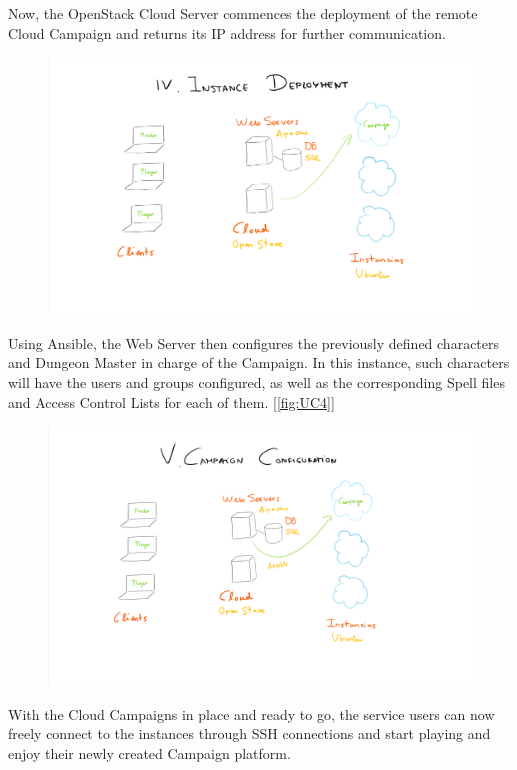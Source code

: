 \documentclass[a4paper,12pt]{report}
\begin{document}
Now, the OpenStack Cloud Server commences the deployment of the remote Cloud Campaign and returns its IP address for further communication. 
\begin{figure}[h!]
\caption{}
\centering
\includegraphics[width=1\textwidth]{images/Phase4.png}
\label{fig:UC4}
\end{figure}


Using Ansible, the Web Server then configures the previously defined characters and Dungeon Master in charge of the Campaign. In this instance, such characters will have the users and groups configured, as well as the corresponding Spell files and Access Control Lists for each of them. [\autoref{fig:UC4}]

\begin{figure}[h!]
\caption{}
\centering
\includegraphics[width=1\textwidth]{images/Phase5.png}
\label{fig:UC5}
\end{figure}


With the Cloud Campaigns in place and ready to go, the service users can now freely connect to the instances through SSH connections and start playing and enjoy their newly created Campaign platform.
\end{document}
